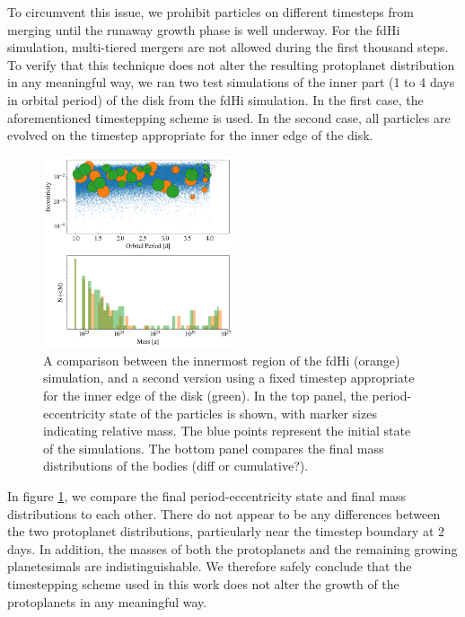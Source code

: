 \documentclass[twocolumn,linenumbers]{aastex63}
\begin{document}
To circumvent this issue, we prohibit particles on different timesteps from merging until the runaway growth phase is well underway. For the fdHi simulation, multi-tiered mergers are not allowed during the first thousand steps. To verify that this technique does not alter the resulting protoplanet distribution in any meaningful way, we ran two test simulations of the inner part (1 to 4 days in orbital period) of the disk from the fdHi simulation. In the first case, the aforementioned timestepping scheme is used. In the second case, all particles are evolved on the timestep appropriate for the inner edge of the disk.

\begin{figure}
\begin{center}
    \includegraphics[width=0.5\textwidth]{figures/rung_ecc.png}
    \caption{A comparison between the innermost region of the fdHi (orange) simulation, and a second version using a fixed timestep appropriate for the inner edge of the disk (green). In the top panel, the period-eccentricity state of the particles is shown, with marker sizes indicating relative mass. The blue points represent the initial state of the simulations. The bottom panel compares the final mass distributions of the bodies (diff or cumulative?).\label{fig:rung_ecc}}
\end{center}
\end{figure}

In figure \ref{fig:rung_ecc}, we compare the final period-eccentricity state and final mass distributions to each other. There do not appear to be any differences between the two protoplanet distributions, particularly near the timestep boundary at 2 days. In addition, the masses of both the protoplanets and the remaining growing planetesimals are indistinguishable. We therefore safely conclude that the timestepping scheme used in this work does not alter the growth of the protoplanets in any meaningful way.



\clearpage
\end{document}
